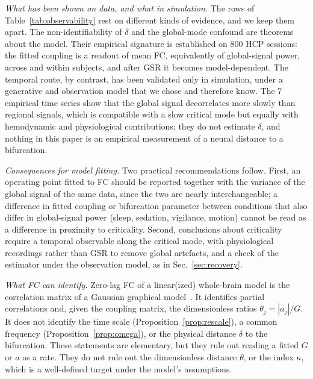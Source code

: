 \documentclass[aip,cha,reprint,amsmath,amssymb]{revtex4-2}
\theoremstyle{remark}
\begin{document}
\emph{What has been shown on data, and what in simulation.} The rows of Table~\ref{tab:observability} rest on different kinds of evidence, and we keep them apart. The non-identifiability of $\delta$ and the global-mode confound are theorems about the model. Their empirical signature is established on 800 HCP sessions: the fitted coupling is a readout of mean FC, equivalently of global-signal power, across and within subjects, and after GSR it becomes model-dependent. The temporal route, by contrast, has been validated only in simulation, under a generative and observation model that we chose and therefore know. The 7 empirical time series show that the global signal decorrelates more slowly than regional signals, which is compatible with a slow critical mode but equally with hemodynamic and physiological contributions; they do not estimate $\delta$, and nothing in this paper is an empirical measurement of a neural distance to a bifurcation.

\emph{Consequences for model fitting.} Two practical recommendations follow. First, an operating point fitted to FC should be reported together with the variance of the global signal of the same data, since the two are nearly interchangeable; a difference in fitted coupling or bifurcation parameter between conditions that also differ in global-signal power (sleep, sedation, vigilance, motion) cannot be read as a difference in proximity to criticality. Second, conclusions about criticality require a temporal observable along the critical mode, with physiological recordings rather than GSR to remove global artefacts, and a check of the estimator under the observation model, as in Sec.~\ref{sec:recovery}.

\emph{What FC can identify.} Zero-lag FC of a linear(ized) whole-brain model is the correlation matrix of a Gaussian graphical model~\cite{Lauritzen1996}. It identifies partial correlations and, given the coupling matrix, the dimensionless ratios $\theta_j=|a_j|/G$. It does not identify the time scale (Proposition~\ref{prop:rescale}), a common frequency (Proposition~\ref{prop:omega}), or the physical distance $\delta$ to the bifurcation. These statements are elementary, but they rule out reading a fitted $G$ or $a$ as a rate. They do not rule out the dimensionless distance $\theta$, or the index $\kappa$, which is a well-defined target under the model's assumptions.
\end{document}
